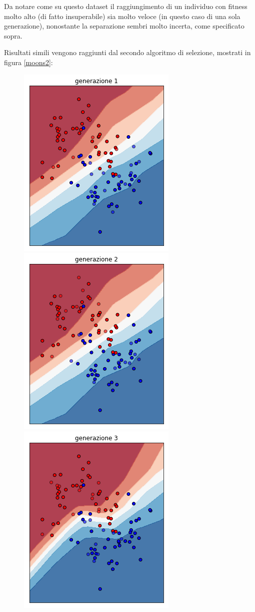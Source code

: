 \documentclass[12pt,a4paper]{report}
\begin{document}
Da notare come su questo dataset il raggiungimento di un individuo con fitness molto alto (di fatto insuperabile) sia molto veloce (in questo caso di una sola generazione), nonostante la separazione sembri molto incerta, come specificato sopra.

Risultati simili vengono raggiunti dal secondo algoritmo di selezione, mostrati in figura \ref{moons2}:

\begin{figure}[H]
 \centering
 \includegraphics[scale = 0.4]{images/moons-sons-acc./1}
 \includegraphics[scale = 0.4]{images/moons-sons-acc./2}
 \includegraphics[scale = 0.4]{images/moons-sons-acc./3}

\end{figure}
\end{document}
